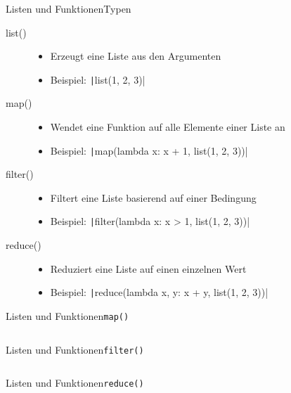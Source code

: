 \documentclass[xelatex,aspectratio=169]{beamer}
\begin{document}
\begin{frame}{Listen und Funktionen}{Typen}
    \begin{description}
        \item[list()]
              \begin{itemize}
                  \item Erzeugt eine Liste aus den Argumenten
                  \item Beispiel: \texttt|list(1, 2, 3)|
              \end{itemize}
        \item[map()]
              \begin{itemize}
                  \item Wendet eine Funktion auf alle Elemente einer Liste an
                  \item Beispiel: \texttt|map(lambda x: x + 1, list(1, 2, 3))|
              \end{itemize}
        \item[filter()]
              \begin{itemize}
                  \item Filtert eine Liste basierend auf einer Bedingung
                  \item Beispiel: \texttt|filter(lambda x: x > 1, list(1, 2, 3))|
              \end{itemize}
        \item[reduce()]
              \begin{itemize}
                  \item Reduziert eine Liste auf einen einzelnen Wert
                  \item Beispiel: \texttt|reduce(lambda x, y: x + y, list(1, 2, 3))|
              \end{itemize}
    \end{description}
\end{frame}

\begin{frame}{Listen und Funktionen}{\texttt{map()}}
    \small
    \inputminted{python}{src/functions_map.py}
\end{frame}

\begin{frame}{Listen und Funktionen}{\texttt{filter()}}
    \small
    \inputminted{python}{src/functions_filter.py}
\end{frame}

\begin{frame}{Listen und Funktionen}{\texttt{reduce()}}
    \small
    \inputminted{python}{src/functions_reduce.py}
\end{frame}
\end{document}
